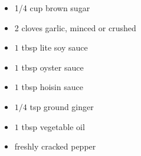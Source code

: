 \begin{minipage}{\textwidth}
\begin{multicols*}{2}
\columnbreak
\begin{minipage}{\linewidth}
\ingredients[Glaze]
\vspace{-1em}
\begin{itemize}
    \item 1/4 cup brown sugar
    \item 2 cloves garlic, minced or crushed
    \item $1$ tbsp lite soy sauce
    \item $1$ tbsp oyster sauce
    \item $1$ tbsp hoisin sauce
    \item $1/4$ tsp ground ginger
    \item $1$ tbsp vegetable oil
    \item freshly cracked pepper
\end{itemize}
\end{minipage}
\end{multicols*}
\end{minipage}
\vspace{1em}

